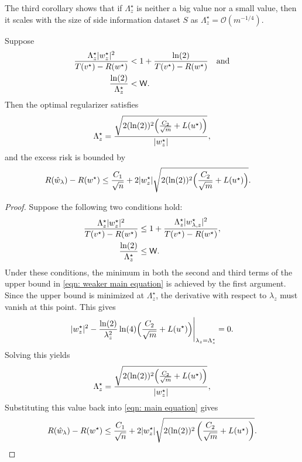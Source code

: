 The third corollary shows that if $\Lambda_z^\star$ is neither a big value nor a small value, then it scales with the size of side information dataset $S$  as $\Lambda_z^\star = \mathcal{O}(m^{-1/4})$.

\begin{corollary}\label{cor: consequence of main theorem 3}
Suppose
    \begin{equation*}
        \begin{aligned}
            \frac{\Lambda_z^\star|w^\star_z|^2}{T(v^\star) - R(w^\star)} &< 1+\frac{\ln(2)}{T(v^\star) - R(w^\star)} \quad \text{and} \\
            \frac{\ln(2)}{\Lambda_z^\star} &< \mathsf{W}.
        \end{aligned}
    \end{equation*}
Then the optimal regularizer satisfies
 \begin{equation*}
        \Lambda_z^\star = \frac{\sqrt{2(\ln(2))^2\Big(\frac{C_2}{\sqrt{m}} + L(u^\star)\Big)}}{|w^\star_z|},
    \end{equation*}
and the excess risk is bounded by
    \begin{equation*}
    \begin{aligned}
        R(\hat{w}_\lambda) - R(w^\star) &\leq \frac{C_1}{\sqrt{n}} + 2|w^\star_z|\sqrt{2(\ln(2))^2\Big(\frac{C_2}{\sqrt{m}} + L(u^\star)\Big)}.
    \end{aligned}
    \end{equation*}
\end{corollary}

\begin{proof}
Suppose the following two conditions hold:
\begin{equation*}
    \begin{aligned}
        \frac{\Lambda_z^\star |w^\star_z|^2}{T(v^\star) - R(w^\star)} &\leq 1 + \frac{\Lambda_z^\star |w^\star_{{\lambda,z}}|^2}{T(v^\star) - R(w^\star)}, \\
        \frac{\ln(2)}{\Lambda_z^\star} &\leq \mathsf{W}.
    \end{aligned}
\end{equation*}
Under these conditions, the minimum in both the second and third terms of the upper bound in \eqref{eqn: weaker main equation} is achieved by the first argument. Since the upper bound is minimized at $\Lambda_z^\star$, the derivative with respect to $\lambda_z$ must vanish at this point. This gives
\begin{equation*}
    |w^\star_z|^2 - \frac{\ln(2)}{\lambda_z^2} \ln(4)\Big(\frac{C_2}{\sqrt{m}} + L(u^\star)\Big)\Bigg|_{\lambda_z = \Lambda_z^\star} = 0.
\end{equation*}
Solving this yields
\begin{equation*}
    \Lambda_z^\star = \frac{\sqrt{2(\ln(2))^2\Big(\frac{C_2}{\sqrt{m}} + L(u^\star)\Big)}}{|w^\star_z|},
\end{equation*}
Substituting this value back into \eqref{eqn: main equation} gives
\begin{equation*}
    R(\hat{w}_\lambda) - R(w^\star) \leq \frac{C_1}{\sqrt{n}} + 2|w^\star_z| \sqrt{ 2(\ln(2))^2 \left( \frac{C_2}{\sqrt{m}} + L(u^\star) \right) }.
\end{equation*}
\end{proof}

